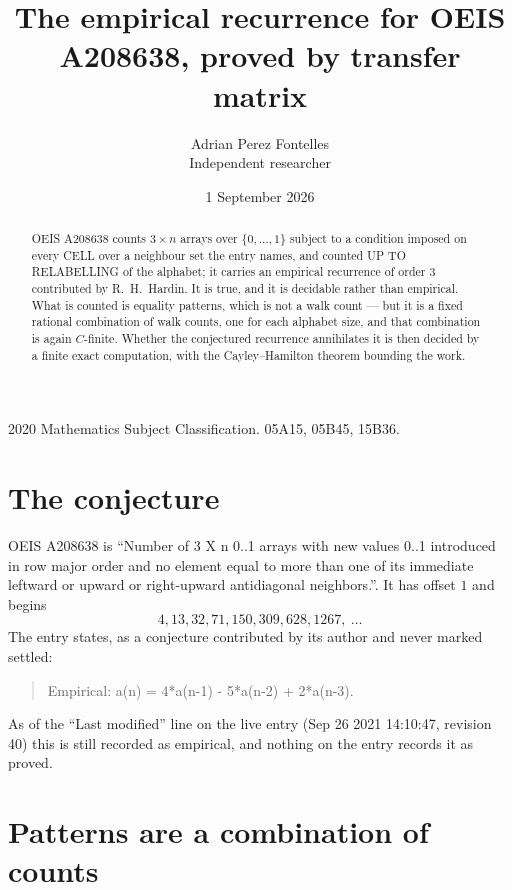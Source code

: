 \documentclass[11pt,a4paper]{article}
\title{The empirical recurrence for OEIS A208638, proved by transfer matrix}
\author{Adrian Perez Fontelles\\ \small Independent researcher}
\date{1 September 2026}
\theoremstyle{plain}
\theoremstyle{definition}
\begin{document}
\maketitle

\begin{abstract}
OEIS A208638 counts $3\times n$ arrays over $\{0,\dots,1\}$ subject to a condition imposed on
every CELL over a neighbour set the entry names, and counted UP TO RELABELLING of the
alphabet; it carries an empirical recurrence of order $3$ contributed by
R.~H.~Hardin. It is true, and it is decidable rather than empirical. What is counted is
equality patterns, which is not a walk count --- but it is a fixed rational combination of
walk counts, one for each alphabet size, and that combination is again $C$-finite. Whether the
conjectured recurrence annihilates it is then decided by a finite exact computation, with the
Cayley--Hamilton theorem bounding the work.
\end{abstract}

\noindent\small 2020 Mathematics Subject Classification. 05A15, 05B45, 15B36.\normalsize

\section{The conjecture}

OEIS A208638 is ``Number of 3 X n 0..1 arrays with new values 0..1 introduced in row major order and no element equal to more than one of its immediate leftward or upward or right-upward antidiagonal neighbors.''. It has offset $1$ and begins
\[
4, 13, 32, 71, 150, 309, 628, 1267,\ \dots
\]
The entry states, as a conjecture contributed by its author and never marked settled:
\begin{quote}
Empirical: a(n) = 4*a(n-1) - 5*a(n-2) + 2*a(n-3).
\end{quote}
As of the ``Last modified'' line on the live entry (Sep 26 2021 14:10:47, revision 40) this is still
recorded as empirical, and nothing on the entry records it as proved.

\section{Patterns are a combination of counts}
\end{document}
